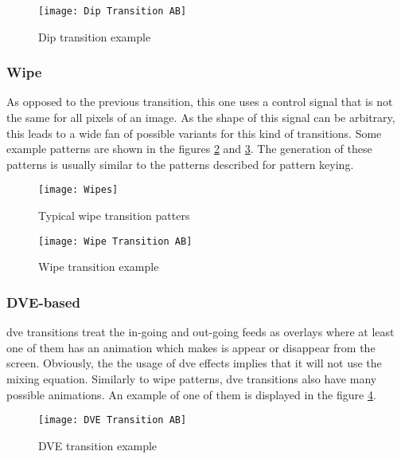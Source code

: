 \documentclass[../main.tex]{subfiles}
\begin{document}
\begin{figure}[htbp]
    \centering
    \texttt{[image: Dip Transition AB]}
    \caption{Dip transition example}
    \label{fig:02:dip_transition_example}
\end{figure}

\subsubsection{Wipe}
As opposed to the previous transition, this one uses a control signal that is not the same for all \glspl{pixel} of an image. As the shape of this signal can be arbitrary, this leads to a wide fan of possible variants for this kind of transitions. Some example patterns are shown in the figures \ref{fig:02:wipes} and \ref{fig:02:wipe_transition_example}. The generation of these patterns is usually similar to the patterns described for pattern keying.\newline

\begin{figure}[htbp]
    \centering
    \texttt{[image: Wipes]}
    \caption{Typical wipe transition patters}
    \label{fig:02:wipes}
\end{figure}

\begin{figure}[htbp]
    \centering
    \texttt{[image: Wipe Transition AB]}
    \caption{Wipe transition example}
    \label{fig:02:wipe_transition_example}
\end{figure}

\subsubsection{DVE-based}
\Gls{dve} transitions treat the in-going and out-going feeds as overlays where at least one of them has an animation which makes is appear or disappear from the screen. Obviously, the the usage of \gls{dve} effects implies that it will not use the mixing equation. Similarly to wipe patterns, \gls{dve} transitions also have many possible animations. An example of one of them is displayed in the figure \ref{fig:02:dve_transition_example}.\newline

\begin{figure}[htbp]
    \centering
    \texttt{[image: DVE Transition AB]}
    \caption{DVE transition example}
    \label{fig:02:dve_transition_example}
\end{figure}
\end{document}
